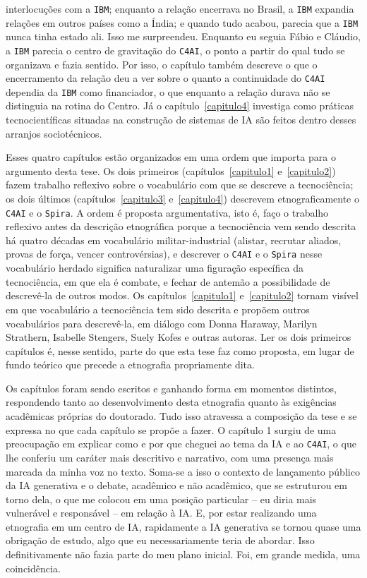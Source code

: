 interlocuções com a \texttt{IBM}; enquanto a relação encerrava no Brasil, a \texttt{IBM} expandia relações em outros países como a Índia; e quando tudo acabou, parecia que a \texttt{IBM} nunca tinha estado ali. Isso me surpreendeu. Enquanto eu seguia Fábio e Cláudio, a \texttt{IBM} parecia o centro de gravitação do \texttt{C4AI}, o ponto a partir do qual tudo se organizava e fazia sentido. Por isso, o capítulo também descreve o que o encerramento da relação deu a ver sobre o quanto a continuidade do \texttt{C4AI} dependia da \texttt{IBM} como financiador, o que enquanto a relação durava não se distinguia na rotina do Centro. Já o capítulo~\ref{capitulo4} investiga como práticas tecnocientíficas situadas na construção de sistemas de IA são feitos dentro desses arranjos sociotécnicos.

Esses quatro capítulos estão organizados em uma ordem que importa para o argumento desta tese. Os dois primeiros (capítulos~\ref{capitulo1} e~\ref{capitulo2}) fazem trabalho reflexivo sobre o vocabulário com que se descreve a tecnociência; os dois últimos (capítulos~\ref{capitulo3} e~\ref{capitulo4}) descrevem etnograficamente o \texttt{C4AI} e o \texttt{Spira}. A ordem é proposta argumentativa, isto é, faço o trabalho reflexivo antes da descrição etnográfica porque a tecnociência vem sendo descrita há quatro décadas em vocabulário militar-industrial (alistar, recrutar aliados, provas de força, vencer controvérsias), e descrever o \texttt{C4AI} e o \texttt{Spira} nesse vocabulário herdado significa naturalizar uma figuração específica da tecnociência, em que ela é combate, e fechar de antemão a possibilidade de descrevê-la de outros modos. Os capítulos~\ref{capitulo1} e~\ref{capitulo2} tornam visível em que vocabulário a tecnociência tem sido descrita e propõem outros vocabulários para descrevê-la, em diálogo com Donna Haraway, Marilyn Strathern, Isabelle Stengers, Suely Kofes e outras autoras. Ler os dois primeiros capítulos é, nesse sentido, parte do que esta tese faz como proposta, em lugar de fundo teórico que precede a etnografia propriamente dita.

Os capítulos foram sendo escritos e ganhando forma em momentos distintos, respondendo tanto ao desenvolvimento desta etnografia quanto às exigências acadêmicas próprias do doutorado. Tudo isso atravessa a composição da tese e se expressa no que cada capítulo se propõe a fazer. O capítulo 1 surgiu de uma preocupação em explicar como e por que cheguei ao tema da IA e ao \texttt{C4AI}, o que lhe conferiu um caráter mais descritivo e narrativo, com uma presença mais marcada da minha voz no texto. Soma-se a isso o contexto de lançamento público da IA generativa e o debate, acadêmico e não acadêmico, que se estruturou em torno dela, o que me colocou em uma posição particular – eu diria mais vulnerável e responsável – em relação à IA. E, por estar realizando uma etnografia em um centro de IA, rapidamente a IA generativa se tornou quase uma obrigação de estudo, algo que eu necessariamente teria de abordar. Isso definitivamente não fazia parte do meu plano inicial. Foi, em grande medida, uma coincidência.

